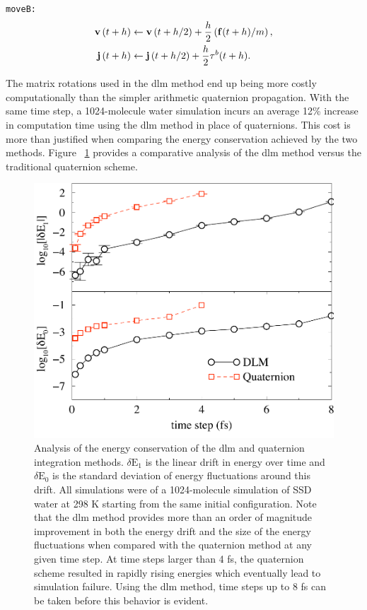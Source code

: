\documentclass[]{book}
\begin{document}
{\tt moveB:}
\begin{align*}
{\bf v}\left(t + h \right)  &\leftarrow  {\bf v}\left(t + h / 2 \right) 
	+ \frac{h}{2} \left( {\bf f}(t + h) / m \right), \\
%
{\bf j}\left(t + h \right)  &\leftarrow {\bf j}\left(t + h / 2 \right) 
	+ \frac{h}{2} {\bf \tau}^b(t + h) .
\end{align*}

The matrix rotations used in the {\sc dlm} method end up being more
costly computationally than the simpler arithmetic quaternion
propagation. With the same time step, a 1024-molecule water simulation
incurs an average 12\% increase in computation time using the {\sc
dlm} method in place of quaternions. This cost is more than justified
when comparing the energy conservation achieved by the two
methods. Figure ~\ref{quatdlm} provides a comparative analysis of the
{\sc dlm} method versus the traditional quaternion scheme.

\begin{figure}
\centering
\includegraphics[width=\linewidth]{quatvsdlm.pdf}
\caption[Energy conservation analysis of the {\sc dlm} and quaternion 
integration methods]{Analysis of the energy conservation of the {\sc
dlm} and quaternion integration methods.  $\delta \mathrm{E}_1$ is the
linear drift in energy over time and $\delta \mathrm{E}_0$ is the
standard deviation of energy fluctuations around this drift.  All
simulations were of a 1024-molecule simulation of SSD water at 298 K
starting from the same initial configuration. Note that the {\sc dlm}
method provides more than an order of magnitude improvement in both
the energy drift and the size of the energy fluctuations when compared
with the quaternion method at any given time step.  At time steps
larger than 4 fs, the quaternion scheme resulted in rapidly rising
energies which eventually lead to simulation failure.  Using the {\sc
dlm} method, time steps up to 8 fs can be taken before this behavior
is evident.}
\label{quatdlm}
\end{figure}
\end{document}
